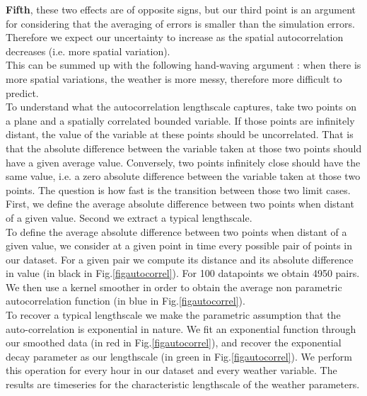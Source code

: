 \textbf{Fifth}, these two effects are of opposite signs, but our third point is an argument for considering that the averaging of errors is smaller than the simulation errors. Therefore we expect our uncertainty to increase as the spatial autocorrelation decreases (i.e. more spatial variation). \\

This can be summed up with the following hand-waving argument : when there is more spatial variations, the weather is more messy, therefore more difficult to predict. \\

To understand what the autocorrelation lengthscale captures, take two points on a plane and a spatially correlated bounded variable. If those points are infinitely distant, the value of the variable at these points should be uncorrelated. That is that the absolute difference between the variable taken at those two points should have a given average value. Conversely, two points infinitely close should have the same value, i.e. a zero absolute difference between the variable taken at those two points. The question is how fast is the transition between those two limit cases. First, we define the average absolute difference between two points when distant of a given value. Second we extract a typical lengthscale. \\

To define the average absolute difference between two points when distant of a given value, we consider at a given point in time every possible pair of points in our dataset. For a given pair we compute its distance and its absolute difference in value (in black in Fig.\ref{figautocorrel}). For 100 datapoints we obtain 4950 pairs. We then use a kernel smoother in order to obtain the average non parametric autocorrelation function (in blue in Fig.\ref{figautocorrel}). \\

To recover a typical lengthscale we make the parametric assumption that the auto-correlation is exponential in nature. We fit an exponential function through our smoothed data (in red in Fig.\ref{figautocorrel}), and recover the exponential decay parameter as our lengthscale (in green in Fig.\ref{figautocorrel}). We perform this operation for every hour in our dataset and every weather variable. The results are timeseries for the characteristic lengthscale of the weather parameters.


